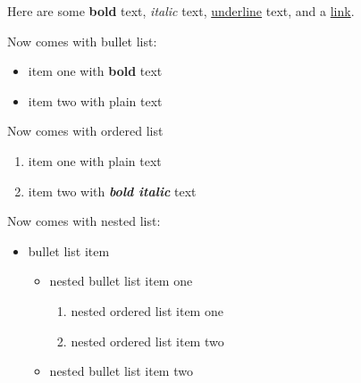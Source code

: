 Here are some \textbf{bold} text, \textit{italic} text, \underline{underline} text, and a \href{https://example.com}{link}.

Now comes with bullet list:

\begin{itemize}
\item item one with \textbf{bold} text
\item item two with plain text
\end{itemize}

Now comes with ordered list

\begin{enumerate}
\item item one with plain text
\item item two with \textit{\textbf{bold italic}} text
\end{enumerate}

Now comes with nested list:

\begin{itemize}
\item bullet list item
\begin{itemize}
\item nested bullet list item one
\begin{enumerate}
\item nested ordered list item one
\item nested ordered list item two
\end{enumerate}
\item nested bullet list item two
\end{itemize}
\end{itemize}

